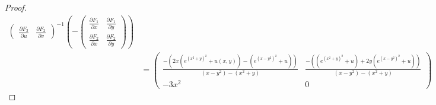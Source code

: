 \documentclass{report}
\begin{document}
\begin{proof}
\begin{align*}
\begin{pmatrix}
  \frac{\partial F_2}{\partial u} & \frac{\partial F_2}{\partial v} 
\end{pmatrix}^{-1} \left( - \begin{pmatrix} 
  \frac{\partial F_1}{\partial x}& \frac{\partial F_1}{\partial y} \\
  \frac{\partial F_2}{\partial x}& \frac{\partial F_2}{\partial y}
\end{pmatrix} \right) \\
&= \begin{pmatrix} 
  \frac{-\left( 2x \left(e^{(x^2+y)^2} +u(x,y) \right) - \left(e^{(x-y^2)^2}+ u \right) \right)}{(x-y^2)-(x^2+y)} & \frac{- \left(\left(e^{(x^2+y)^2}+u \right) + 2y \left(e^{(x-y^2)^2}+u \right) \right)}{(x-y^2)-(x^2+y)} \\
  -3x^2 & 0
\end{pmatrix}
\end{align*}

\end{proof}
\end{document}
